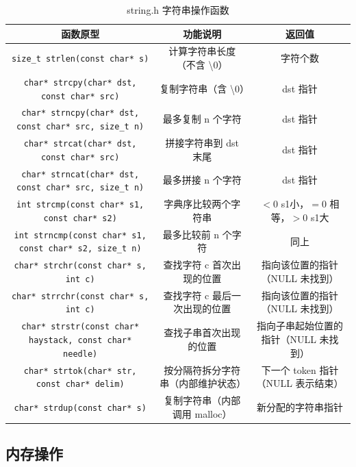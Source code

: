 \begin{table}[H]
\centering
\small
\renewcommand{\arraystretch}{1.6}
\begin{tabulary}{\linewidth}{CCC}
\toprule
\textbf{函数原型} & \textbf{功能说明} & \textbf{返回值} \\ \midrule
\texttt{size\_t strlen(const char* s)} & 计算字符串长度（不含 \textbackslash 0） & 字符个数 \\ 
\texttt{char* strcpy(char* dst, const char* src)} & 复制字符串（含 \textbackslash 0） & dst 指针 \\ 
\texttt{char* strncpy(char* dst, const char* src, size\_t n)} & 最多复制 n 个字符 & dst 指针 \\ 
\texttt{char* strcat(char* dst, const char* src)} & 拼接字符串到 dst 末尾 & dst 指针 \\ 
\texttt{char* strncat(char* dst, const char* src, size\_t n)} & 最多拼接 n 个字符 & dst 指针 \\ 
\texttt{int strcmp(const char* s1, const char* s2)} & 字典序比较两个字符串 & $<0$ s1小，$=0$ 相等，$>0$ s1大 \\ 
\texttt{int strncmp(const char* s1, const char* s2, size\_t n)} & 最多比较前 n 个字符 & 同上 \\ 
\texttt{char* strchr(const char* s, int c)} & 查找字符 c 首次出现的位置 & 指向该位置的指针（NULL 未找到） \\ 
\texttt{char* strrchr(const char* s, int c)} & 查找字符 c 最后一次出现的位置 & 指向该位置的指针（NULL 未找到） \\ 
\texttt{char* strstr(const char* haystack, const char* needle)} & 查找子串首次出现的位置 & 指向子串起始位置的指针（NULL 未找到） \\ 
\texttt{char* strtok(char* str, const char* delim)} & 按分隔符拆分字符串（内部维护状态） & 下一个 token 指针（NULL 表示结束） \\ 
\texttt{char* strdup(const char* s)} & 复制字符串（内部调用 malloc） & 新分配的字符串指针 \\ \bottomrule
\end{tabulary}
\caption{string.h 字符串操作函数}
\label{tab:string_ops}
\end{table}

\subsection{内存操作}

